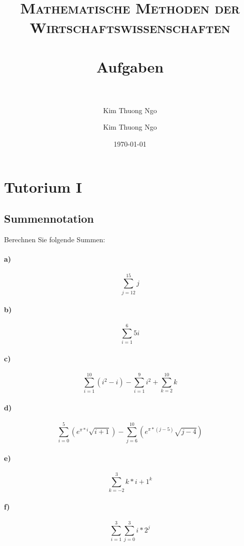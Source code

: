 \documentclass[paper=a4, fontsize=11pt]{scrartcl}
\author{Kim Thuong Ngo}
\title{
\normalfont \normalsize
\textsc{Mathematische Methoden der Wirtschaftswissenschaften} \\ [25pt]
\horrule{0.5pt} \\[0.4cm]
\huge Aufgaben \\
\horrule{2pt} \\[0.5cm]
}
\author{Kim Thuong Ngo}
\date{\normalsize\today}
\numberwithin{equation}{section}
\numberwithin{figure}{section}
\numberwithin{table}{section}
\begin{document}
\maketitle

\newpage

\tableofcontents

\newpage
\section{Tutorium I}
\subsection{Summennotation}
Berechnen Sie folgende Summen:
\paragraph{a)}
$$\sum^{15}_{j=12}j$$

\paragraph{b)}
$$\sum^{6}_{i=1}5i$$

\paragraph{c)}
$$\sum^{10}_{i=1}(i^{2}-i)-\sum^{9}_{i=1}i^{2}+\sum^{10}_{k=2}k$$

\paragraph{d)}
$$\sum^{5}_{i=0}(e^{\pi *i} \sqrt{i+1})-\sum^{10}_{j=6}(e^{\pi *(j-5)} \sqrt{j-4})$$

\paragraph{e)}
$$\sum^{3}_{k=-2}k*i+1^{k}$$

\paragraph{f)}
$$\sum^{3}_{i=1} \sum^{3}_{j=0}i*2^{j}$$
\end{document}
